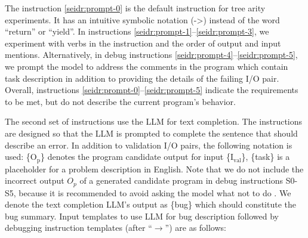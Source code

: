 The instruction \ref{seidr:prompt-0} is the default instruction for tree arity experiments. 
It has an intuitive symbolic notation (->) instead of the word ``return'' or ``yield''. 
In instructions \ref{seidr:prompt-1}--\ref{seidr:prompt-3}, we experiment with verbs in the instruction and the order of output and input mentions. 
Alternatively, in debug instructions \ref{seidr:prompt-4}--\ref{seidr:prompt-5}, we prompt the model to address the comments in the program which contain task description in addition to providing the details of the failing I/O pair. 
Overall, instructions \ref{seidr:prompt-0}--\ref{seidr:prompt-5} indicate the requirements to be met, but do not describe the current program's behavior. 

The second set of instructions use the LLM for text completion. 
The instructions are designed so that the LLM is prompted to complete the sentence that should describe an error. 
In addition to validation I/O pairs, the following notation is used: \{O$_{\text{p}}$\} denotes the program candidate output for input \{I$_{\text{val}}$\}, \{task\} is a placeholder for a problem description in English. 
Note that we do not include the incorrect output $O_p$ of a generated candidate program in debug instructions S0-S5, because it is recommended to avoid asking the model what not to do \cite{BestPracticesPrompt}. 
We denote the text completion LLM's output as \{bug\} which should constitute the bug summary.
Input templates to use LLM for bug description followed by debugging instruction templates (after ``$\rightarrow$'') are as follows:
